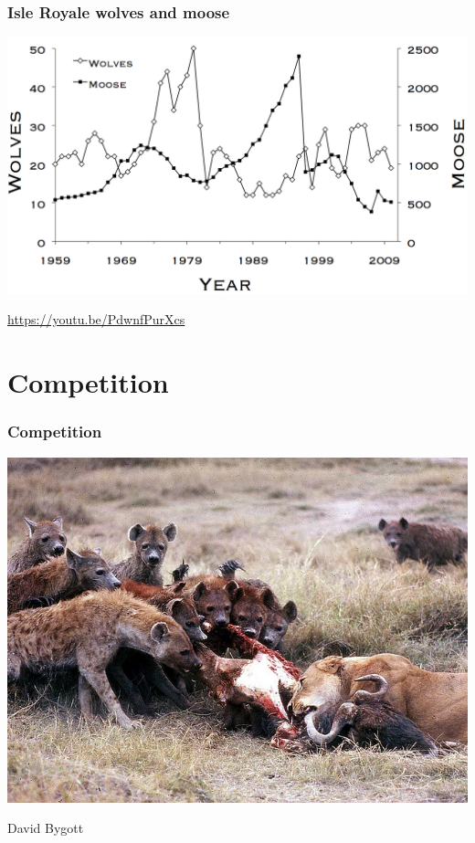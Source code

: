 \documentclass[color=usenames,dvipsnames]{beamer}\usepackage[]{graphicx}\usepackage[]{color}
\begin{document}
\begin{frame}
  \frametitle{Isle Royale wolves and moose}
  \centering
  \includegraphics[width=1\textwidth]{figs/Fig01_wolfmoosechronology} \par
  \url{https://youtu.be/PdwnfPurXcs}
\end{frame}






\section{Competition}




\begin{frame}
  \frametitle{Competition}
  \begin{center}
    \includegraphics[width=.95\textwidth]{figs/Hyena_lion} \par
    \vspace{-0.5cm} \hspace{.75\textwidth}
    {\tiny David Bygott \par}
  \end{center}
\end{frame}
\end{document}
